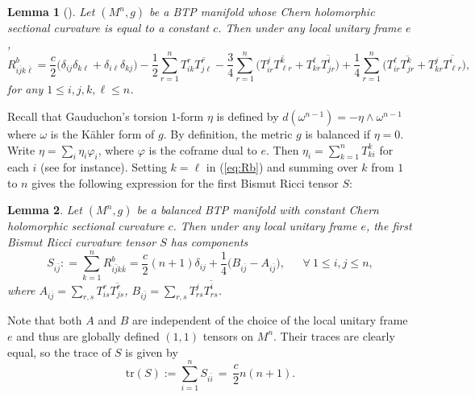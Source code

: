 \documentclass{amsart}
\newtheorem{lemma}{Lemma}
\begin{document}
\begin{lemma}[\cite{ChenZ26}]  \label{lemmaRb}
Let $(M^n,g)$ be a BTP manifold whose Chern holomorphic sectional curvature is equal to a constant $c$. Then under any local unitary frame $e$,
\begin{equation} \label{eq:Rb}
R^b_{i\bar{j}k\bar{\ell}} = \frac{c}{2} \big( \delta_{ij}\delta_{k\ell} + \delta_{i\ell}\delta_{kj} \big) - \frac{1}{2}\sum_{r=1}^n T^r_{ik} \overline{ T^r_{j\ell }} - \frac{3}{4}\sum_{r=1}^n \big( T^j_{ir} \overline{ T^k_{\ell r}} + T^{\ell}_{kr} \overline{ T^i_{j r}}  \big) + \frac{1}{4}\sum_{r=1}^n \big( T^{\ell}_{ir} \overline{ T^k_{j r}} + T^{j}_{kr} \overline{ T^i_{\ell r}}  \big),
\end{equation}
for any $1\leq i,j,k,\ell \leq n$.
\end{lemma}

Recall that Gauduchon's torsion $1$-form $\eta$ is defined by $d(\omega^{n-1})=-\eta\wedge \omega^{n-1}$ where $\omega$ is the K\"ahler form of $g$. By definition, the metric $g$ is balanced if $\eta =0$. Write $\eta=\sum_i\eta_i\varphi_i$, where $\varphi$ is the coframe dual to $e$. Then $\eta_i = \sum_{k=1}^n T^k_{ki}$ for each $i$ (see \cite{ZhaoZ24} for instance). Setting $k=\ell$ in (\ref{eq:Rb}) and summing over $k$ from $1$ to $n$ gives the following expression for the first Bismut Ricci tensor $S$:

\begin{lemma} \label{lemmaS}
Let $(M^n,g)$ be a balanced BTP manifold with constant Chern holomorphic sectional curvature $c$. Then under any local unitary frame $e$, the first Bismut Ricci curvature tensor $S$ has components
\begin{equation} \label{eq:S}
S_{i\bar{j}} : = \sum_{k=1}^n R^b_{i\bar{j}k\bar{k}} = \frac{c}{2}(n+1) \delta_{ij} + \frac{1}{4}\big( B_{i\bar{j}} - A_{i\bar{j}}  \big), \ \ \ \ \ \ \ \forall \ 1\leq i,j\leq n,
\end{equation}
where $A_{i\bar{j}} = \sum_{r,s}T^r_{is} \overline{ T^r_{js}} $, $B_{i\bar{j}} = \sum_{r,s}T^j_{rs} \overline{ T^i_{rs}} $.
\end{lemma}

Note that both $A$ and $B$ are independent of the choice of the local unitary frame $e$ and thus are globally defined $(1,1)$ tensors on $M^n$. Their traces are clearly equal, so the trace of $S$ is given by
\begin{equation} \label{eq:traceS}
\mbox{tr}(S) := \sum_{i=1}^n S_{i\bar{i}} \,= \,\frac{c}{2}n(n+1).
\end{equation}
\end{document}
